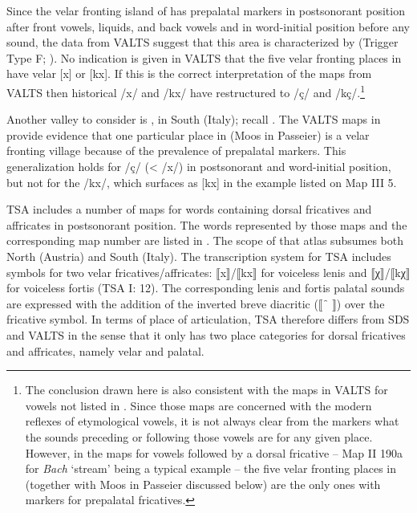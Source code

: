 Since the velar fronting island of  has prepalatal markers in postsonorant position after front vowels, liquids, and back vowels and in word-initial position before any sound, the data from VALTS suggest that this area is characterized by  (Trigger Type F; ). No indication is given in VALTS that the five velar fronting places in   have velar [x] or [kx]. If this is the correct interpretation of the maps from VALTS then historical /x/ and /kx/ have restructured to /ç/ and /kç/.{\footnote{The conclusion drawn here is also consistent with the maps in VALTS for vowels not listed in . Since those maps are concerned with the modern reflexes of etymological vowels, it is not always clear from the markers what the sounds preceding or following those vowels are for any given place. However, in the maps for vowels followed by a dorsal fricative -- Map II 190a for \textit{Bach} ‘stream’ being a typical example -- the five velar fronting places in  (together with Moos in Passeier discussed below) are the only ones with markers for prepalatal fricatives.}}

Another valley to consider is , in South  (Italy); recall . The VALTS maps in  provide evidence that one particular place in  (Moos in Passeier) is a velar fronting village because of the prevalence of prepalatal markers. This generalization holds for /ç/ (< /x/) in postsonorant and word-initial position, but not for the  /kx/, which surfaces as [kx] in the example listed on Map III 5.

TSA includes a number of maps for words containing dorsal fricatives and affricates in postsonorant position. The words represented by those maps and the corresponding map number are listed in . The scope of that atlas subsumes both North  (Austria) and South  (Italy). The transcription system for TSA includes symbols for two velar fricatives/affricates: ⟦x⟧/⟦kx⟧ for voiceless lenis and ⟦χ⟧/⟦kχ⟧ for voiceless fortis (TSA I: 12). The corresponding lenis and fortis palatal sounds are expressed with the addition of the inverted breve diacritic (⟦~{̑ }\kern-4pt⟧) over the fricative symbol. In terms of place of articulation, TSA therefore differs from SDS and VALTS in the sense that it only has two place categories for dorsal fricatives and affricates, namely velar and palatal.

